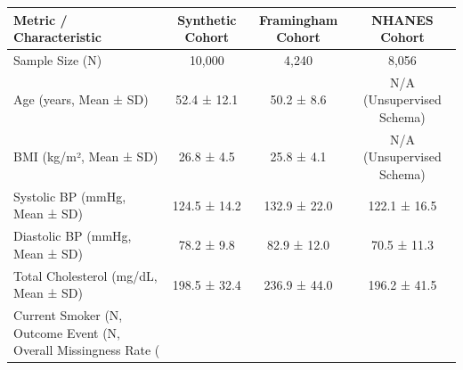 \begin{tabular}{lccc}
\toprule
Metric / Characteristic & Synthetic Cohort & Framingham Cohort & NHANES Cohort \\
\midrule
Sample Size (N) & 10,000 & 4,240 & 8,056 \\
Age (years, Mean ± SD) & 52.4 ± 12.1 & 50.2 ± 8.6 & N/A (Unsupervised Schema) \\
BMI (kg/m², Mean ± SD) & 26.8 ± 4.5 & 25.8 ± 4.1 & N/A (Unsupervised Schema) \\
Systolic BP (mmHg, Mean ± SD) & 124.5 ± 14.2 & 132.9 ± 22.0 & 122.1 ± 16.5 \\
Diastolic BP (mmHg, Mean ± SD) & 78.2 ± 9.8 & 82.9 ± 12.0 & 70.5 ± 11.3 \\
Total Cholesterol (mg/dL, Mean ± SD) & 198.5 ± 32.4 & 236.9 ± 44.0 & 196.2 ± 41.5 \\
Current Smoker (N, %
Outcome Event (N, %
Overall Missingness Rate (%
\bottomrule
\end{tabular}
